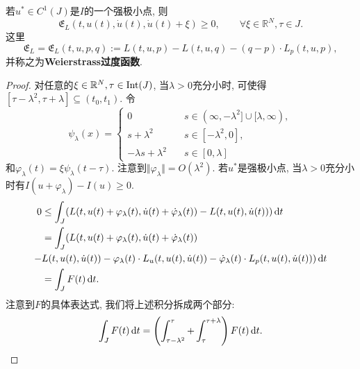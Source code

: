 \begin{proposition}[必要条件]
    若$u^* \in C^1(J)$是$I$的一个强极小点, 则
    \begin{equation*}
        \mathfrak{E}_L(t, u(t), \dot u(t), \dot u(t) + \xi) \geq 0, \qquad \forall \xi \in \mathbb{R}^N, \tau \in J.
    \end{equation*}
    这里
    \begin{equation*}
        \boxed{\mathfrak{E}_L = \mathfrak{E}_L(t, u, p, q) := L(t, u, p) - L(t, u, q) - (q - p) \cdot L_p(t, u, p),}
    \end{equation*}
    并称之为\textbf{Weierstrass过度函数}.
    \begin{proof}
        对任意的$\xi \in \mathbb{R}^N, \tau \in {\rm Int}(J)$, 当$\lambda > 0$充分小时, 可使得$[\tau - \lambda^2, \tau+\lambda] \subseteq (t_0, t_1)$.
        令
        \begin{equation} 
            \psi_{\lambda}(x) =  
            \begin{cases} 
                0 \quad &s\in (\infty, -\lambda^2] \cup [\lambda, \infty), \\  
                s + \lambda^2 \quad &s \in [-\lambda^2, 0], \\  
                -\lambda s + \lambda^2 \quad &s \in [0, \lambda] 
        \end{cases} 
    \end{equation}
    和$\varphi_{\lambda}(t) = \xi\psi_{\lambda}(t - \tau)$. 注意到$\Vert \varphi_{\lambda}\Vert = O(\lambda^2)$. 若$u^*$是强极小点, 当$\lambda > 0$充分小时有$I(u + \varphi_{\lambda}) - I(u) \geq 0$.
    \begin{align*} 
        0 &\leq \int_J(L(t, u(t) + \varphi_{\lambda}(t), \dot u(t) + \dot\varphi_{\lambda}(t)) - L(t, u(t), \dot u(t))) \,{\rm d}t \\  
        &= \int_J(L(t, u(t) + \varphi_{\lambda}(t), \dot u(t) + \dot\varphi_{\lambda}(t)) \\
        - &L(t, u(t), \dot u(t)) - \varphi_{\lambda} (t) \cdot L_u(t, u(t), \dot u(t)) - \dot\varphi_{\lambda}(t) \cdot L_p(t, u(t), \dot u(t))) \,{\rm d}t \\ 
        &= \int_J F(t) \,{\rm d}t. 
    \end{align*}
    注意到$F$的具体表达式, 我们将上述积分拆成两个部分:
    \begin{equation*}
        \int_JF(t) \,{\rm d}t = \left(\int_{\tau - \lambda^2}^{\tau} + \int_{\tau}^{\tau + \lambda}\right)F(t) \,{\rm d}t.
    \end{equation*}

\end{proof}
\end{proposition}
